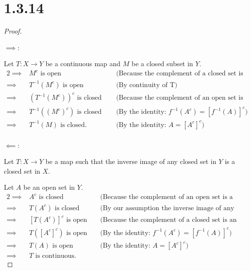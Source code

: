 \documentclass{article}
\begin{document}
\section*{1.3.14}
\begin{proof}
  $ $
  
  \underline{$\implies$}:

  Let $T: X \longrightarrow Y$ be a continuous map and $M$ be a closed subset in $Y$.
  \begin{alignat*}{2}
    \implies& M^c \text{ is open} \quad &&\text{(Because the complement of a closed set is an open set by definition 1.3-2)} \\
    \implies& T^{-1}(M^c) \text{ is open } \quad &&\text{(By continuity of T)} \\
    \implies& (T^{-1}(M^c))^c \text{ is closed } \quad &&\text{(Because the complement of an open set is a closed set by definition 1.3-2)} \\
    \implies& T^{-1}((M^c)^c) \text{ is closed } \quad &&\text{(By the identity: } f^{-1}(A^c) = [f^{-1}(A)]^c \text{)} \\
    \implies& T^{-1}(M) \text{ is closed.} \quad &&\text{(By the identity: } A = [A^c]^c \text{)}\\
  \end{alignat*}

  \underline{$\impliedby$}:

  Let $T: X \longrightarrow Y$ be a map such that the inverse image of any closed set in $Y$ is a closed set in $X$.
  
  Let $A$ be an open set in $Y$.
  \begin{alignat*}{2}
    \implies& A^c \text{ is closed} \quad &&\text{(Because the complement of an open set is a closed set by definition 1.3-2)} \\
    \implies& T(A^c) \text{ is closed} \quad &&\text{(By our assumption the inverse image of any closed set is a closed set)} \\
    \implies& [T(A^c)]^c \text{ is open} \quad &&\text{(Because the complement of a closed set is an open set by definition 1.3-2)} \\
    \implies& T([A^c]^c) \text{ is open} \quad &&\text{(By the identity: } f^{-1}(A^c) = [f^{-1}(A)]^c \text{)} \\
    \implies& T(A) \text{ is open} \quad &&\text{(By the identity: } A = [A^c]^c \text{)} \\
    \implies& T \text{ is continuous.}
  \end{alignat*}

\end{proof}
\end{document}
